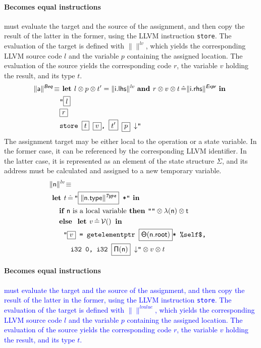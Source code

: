 \documentclass{llncs}
\newcommand{\trad}[2]{\ensuremath{\lVert \textsf{#1} \rVert^{\textit{#2}}}}
\newcommand{\nl}[0]{\ensuremath{\downarrow}}
\DeclareMathOperator{\conc}{\diamond}
\DeclareMathOperator{\isdef}{\equiv}
\DeclareMathOperator{\variable}{\mathcal{V}()}
\newcommand{\llvm}[1]{\texttt{#1}}
\newcommand{\B}[1]{\textsf{#1}}
\newcommand{\IF}[0]{\textbf{ if }}
\newcommand{\ELSE}[0]{\textbf{ else }}
\newcommand{\THEN}[0]{\textbf{ then }}
\newcommand{\LET}[0]{\textbf{ let }}
\DeclareMathOperator{\BE}{\hat{=}}
\newcommand{\IN}[0]{\textbf{ in }}
\newcommand{\AND}[0]{\textbf{ and }}
\newcommand{\PH}[1]{\framebox{$#1$}}
\newcommand{\sep}[0]{\otimes}
\newcommand{\local}[0]{\ensuremath{\sf\lambda}}
\newcommand{\idx}[0]{\ensuremath{\sf\Pi}}
\newcommand{\state}[0]{\ensuremath{\sf\Theta}}
\newcommand{\self}[0]{\llvm{\%self\$}}
\begin{document}
\paragraph{Becomes equal instructions} must evaluate the target and the source
of the assignment, and then copy the result of the latter in the former, using
the LLVM instruction \llvm{store}. The evaluation of the target is defined with
$\trad{}{lv}$, which yields the corresponding LLVM source code $l$ and the
variable $p$ containing the assigned location. The evaluation of the source
yields the corresponding code $r$, the variable $v$ holding the result, and its
type $t$.
\begin{align*}
\begin{split}
  \trad{a}{\B{Beq}} \isdef
  & \LET l \sep p \sep t'= \trad{i.lhs}{lv} \AND r \sep v \sep t \BE \trad{i.rhs}{\B{Expr}} \IN \\
  & \llvm{"\PH{l}} \\
  & \llvm{\PH{r}} \\
  & \llvm{store \PH{t} \PH{v}, \PH{t'} \PH{p} \nl"}
\end{split}
\end{align*}
The assignment target may be either local to the operation or a state
variable. In the former case, it can be referenced by the corresponding LLVM
identifier. In the latter case, it is represented as an element of the state
structure $\Sigma$, and its address must be calculated and assigned to a new temporary
variable.
\begin{align*}
\lefteqn{\trad{n}{lv} \isdef} \\
& \LET t \BE \llvm{"\PH{\trad{\B{n.type}}{Type}} *"} \IN \\
& \quad \IF \mbox{\B{n} is a local variable} \THEN \llvm{""} \sep \local(\B{n}) \sep t \\
& \quad \ELSE \LET v \BE \variable \IN \\
& \quad \quad \llvm{"\PH{v} = getelementptr \PH{\state(\B{n.root})}* \self,} \\
& \quad \quad \quad \llvm{i32 0, i32 \PH{\idx(\B{n})} \nl"} \sep v \sep t
\end{align*}

\paragraph{Becomes equal instructions} \textcolor{blue}{ must evaluate the
 target and the source of the assignment, and then copy the result of the 
latter in the former, using the LLVM instruction \llvm{store}. The evaluation 
of the target is defined with $\trad{}{lvalue}$, which yields the corresponding 
LLVM source code $l$ and the variable $p$ containing the assigned location. The 
evaluation of the source yields the corresponding code $r$, the variable $v$ 
holding the result, and its type $t$. }
\end{document}
